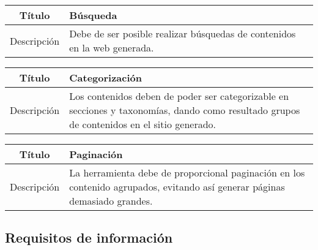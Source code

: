 \begin{center}

    \begin{tabularx}{\textwidth}{|c|X|}
        \hline
        Título & Búsqueda\\

        \hline

        Descripción & Debe de ser posible realizar búsquedas de contenidos en la web generada.\\

        \hline
    \end{tabularx}
\end{center}

\begin{center}

    \begin{tabularx}{\textwidth}{|c|X|}
        \hline
        Título & Categorización\\

        \hline

        Descripción & Los contenidos deben de poder ser categorizable en secciones y taxonomías,
        dando como resultado grupos de contenidos en el sitio generado.\\

        \hline
    \end{tabularx}
\end{center}

\begin{center}

    \begin{tabularx}{\textwidth}{|c|X|}
        \hline
        Título & Paginación\\

        \hline

        Descripción & La herramienta debe de proporcional paginación en los contenido agrupados, 
        evitando así generar páginas demasiado grandes.\\

        \hline
    \end{tabularx}
\end{center}

\subsection{Requisitos de información}

